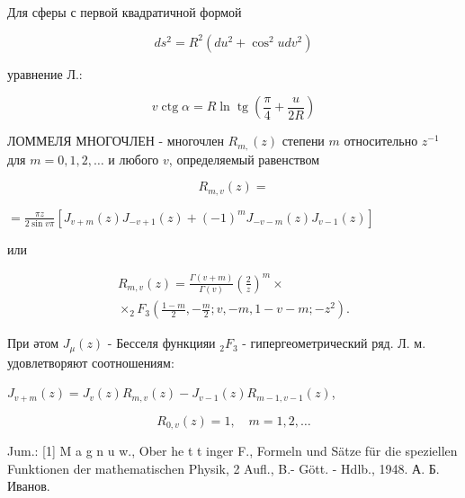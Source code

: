\documentclass[10pt]{article}
\begin{document}
Для сферы с первой квадратичной формой



\[

d s^{2}=R^{2}\left(d u^{2}+\cos ^{2} u d v^{2}\right)

\]



уравнение Л.:



\[

v \operatorname{ctg} \alpha=R \ln \operatorname{tg}\left(\frac{\pi}{4}+\frac{u}{2 R}\right)

\]



ЛОММЕЛЯ МНОГОЧЛЕН - многочлен $R_{m,}(z)$ степени $m$ относительно $z^{-1}$ для $m=0,1,2, \ldots$ и любого $v$, определяемый равенством



\[

R_{m, v}(z)=

\]



$=\frac{\pi z}{2 \sin v \pi}\left[J_{v+m}(z) J_{-v+1}(z)+(-1)^{m} J_{-v-m}(z) J_{v-1}(z)\right]$



или



\[

\begin{gathered}

R_{m, v}(z)=\frac{\Gamma(v+m)}{\Gamma(v)}\left(\frac{2}{z}\right)^{m} \times \\

\times_{2} F_{3}\left(\frac{1-m}{2},-\frac{m}{2} ; v,-m, 1-v-m ;-z^{2}\right) .

\end{gathered}

\]



При әтом $J_{\mu}(z)$ - Бесселя функцияи ${ }_{2} F_{3}$ - гипергеометрический ряд. Л. м. удовлетворяют соотношениям:



$J_{v+m}(z)=J_{v}(z) R_{m, v}(z)-J_{v-1}(z) R_{m-1, v-1}(z)$,



\[

R_{0, v}(z)=1, \quad m=1,2, \ldots

\]



Jum.: [1] M a g n u w., Ober he t t inger F., Formeln und Sätze für die speziellen Funktionen der mathematischen Physik, 2 Aufl., B.- Gött. - Hdlb., 1948. А. Б. Иванов.
\end{document}

